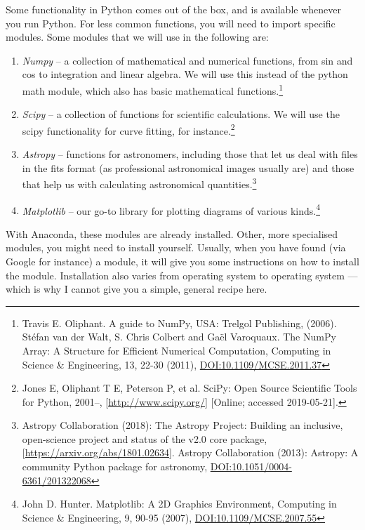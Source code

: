 \documentclass[twocolumn,apj]{openjournal}
\begin{document}
Some functionality in Python comes out of the box, and is available whenever you run Python. For less common functions, you will need to import specific modules. Some modules that we will use in the following are:
\label{ModuleTable}
\begin{enumerate}
\item {\em Numpy} -- a collection of mathematical and numerical functions, from sin and cos to integration and linear algebra. We will use this instead of the python math module, which also has basic mathematical functions.\footnote{Travis E. Oliphant. A guide to NumPy, USA: Trelgol Publishing, (2006).
St\'efan van der Walt, S. Chris Colbert and Ga\"el Varoquaux. The NumPy Array: A Structure for Efficient Numerical Computation, Computing in Science \& Engineering, 13, 22-30 (2011), \href{http://dx.doi.org/10.1109/MCSE.2011.37}{DOI:10.1109/MCSE.2011.37}}
\item {\em Scipy} -- a collection of functions for scientific calculations. We will use the scipy functionality for curve fitting, for instance.\footnote{Jones E, Oliphant T E, Peterson P, et al. SciPy: Open Source Scientific Tools for Python, 2001--, [\href{http://www.scipy.org/}{http://www.scipy.org/}] [Online; accessed 2019-05-21].}
\item {\em Astropy} -- functions for astronomers, including those that let us deal with files in the fits format (as professional astronomical images usually are) and those that help us with calculating astronomical quantities.\footnote{Astropy Collaboration (2018): The Astropy Project: Building an inclusive, open-science project and status of the v2.0 core package, [\href{https://arxiv.org/abs/1801.02634}{https://arxiv.org/abs/1801.02634}]. Astropy Collaboration (2013): Astropy: A community Python package for astronomy, \href{https://doi.org/10.1051/0004-6361/201322068}{DOI:10.1051/0004-6361/201322068}}
\item {\em Matplotlib} -- our go-to library for plotting diagrams of various kinds.\footnote{John D. Hunter. Matplotlib: A 2D Graphics Environment, Computing in Science \& Engineering, 9, 90-95 (2007), \href{http://dx.doi.org/10.1109/MCSE.2007.55}{DOI:10.1109/MCSE.2007.55}}
\end{enumerate}
With Anaconda, these modules are already installed. Other, more specialised modules, you might need to install yourself. Usually, when you have found (via Google for instance) a module, it will give you some instructions on how to install the module. Installation also varies from operating system to operating system --- which is why I cannot give you a simple, general recipe here. 
\end{document}
